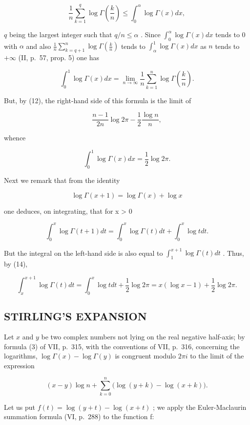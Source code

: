 \[
\frac {1}{n} \sum_ {k = 1} ^ {q} \log \Gamma \left(\frac {k}{n}\right) \leqslant \int_ {0} ^ {\alpha} \log \Gamma (x) d x,
\]

\(q\) being the largest integer such that \(q / n \leqslant \alpha\) . Since \(\int_{0}^{\alpha} \log \Gamma(x) dx\) tends to 0 with \(\alpha\) and also \(\frac{1}{n} \sum_{k=q+1}^{n} \log \Gamma\left(\frac{k}{n}\right)\) tends to \(\int_{\alpha}^{1} \log \Gamma(x) dx\) as \(n\) tends to \(+\infty\) (II, p.~57, prop. 5) one has

\[
\int_ {0} ^ {1} \log \Gamma (x) d x = \lim _ {n \rightarrow \infty} \frac {1}{n} \sum_ {k = 1} ^ {n} \log \Gamma \left(\frac {k}{n}\right).
\]

But, by (12), the right-hand side of this formula is the limit of

\[
\frac {n - 1}{2 n} \log 2 \pi - \frac {1}{2} \frac {\log n}{n},
\]

whence

\[
\int_ {0} ^ {1} \log \Gamma (x) d x = \frac {1}{2} \log 2 \pi .\tag{14}
\]

Next we remark that from the identity

\[
\log \Gamma (x + 1) = \log \Gamma (x) + \log x
\]

one deduces, on integrating, that for x \textgreater{} 0

\[
\int_ {0} ^ {x} \log \Gamma (t + 1) d t = \int_ {0} ^ {x} \log \Gamma (t) d t + \int_ {0} ^ {x} \log t d t.
\]

But the integral on the left-hand side is also equal to \(\int_{1}^{x + 1}\log \Gamma (t)dt\) . Thus, by (14),

\[
\int_ {x} ^ {x + 1} \log \Gamma (t) d t = \int_ {0} ^ {x} \log t d t + \frac {1}{2} \log 2 \pi = x (\log x - 1) + \frac {1}{2} \log 2 \pi .
\]

\subsection{STIRLING'S EXPANSION}

Let \(x\) and \(y\) be two complex numbers not lying on the real negative half-axis; by formula (3) of VII, p.~315, with the conventions of VII, p.~316, concerning the logarithms, \(\log \Gamma(x) - \log \Gamma(y)\) is congruent modulo \(2\pi i\) to the limit of the expression

\[
(x - y) \log n + \sum_ {k = 0} ^ {n} \Big (\log (y + k) - \log (x + k) \Big).\tag{15}
\]

Let us put \(f(t) = \log(y + t) - \log(x + t)\) ; we apply the Euler-Maclaurin summation formula (VI, p.~288) to the function f:

